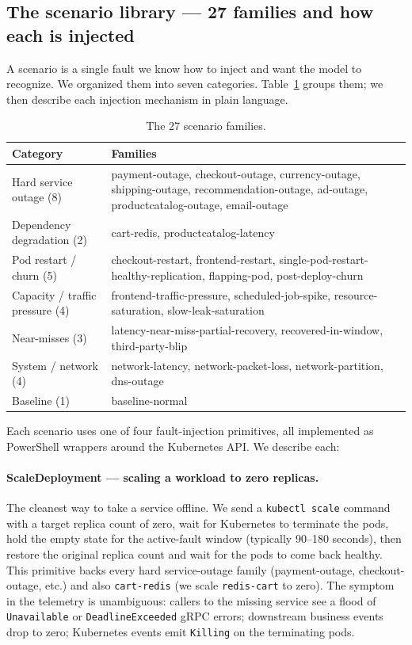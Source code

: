 \subsection{The scenario library --- 27 families and how each is injected}

A scenario is a single fault we know how to inject and want the model to recognize. We organized them into seven categories. Table~\ref{tab:scenarios} groups them; we then describe each injection mechanism in plain language.

\begin{table}[h]
\centering
\caption{The 27 scenario families.}
\label{tab:scenarios}
\small
\begin{tabularx}{\linewidth}{l X}
\toprule
Category & Families \\
\midrule
Hard service outage (8) & payment-outage, checkout-outage, currency-outage, shipping-outage, recommendation-outage, ad-outage, productcatalog-outage, email-outage \\
Dependency degradation (2) & cart-redis, productcatalog-latency \\
Pod restart / churn (5) & checkout-restart, frontend-restart, single-pod-restart-healthy-replication, flapping-pod, post-deploy-churn \\
Capacity / traffic pressure (4) & frontend-traffic-pressure, scheduled-job-spike, resource-saturation, slow-leak-saturation \\
Near-misses (3) & latency-near-miss-partial-recovery, recovered-in-window, third-party-blip \\
System / network (4) & network-latency, network-packet-loss, network-partition, dns-outage \\
Baseline (1) & baseline-normal \\
\bottomrule
\end{tabularx}
\end{table}

Each scenario uses one of four fault-injection primitives, all implemented as PowerShell wrappers around the Kubernetes API. We describe each:

\paragraph{ScaleDeployment --- scaling a workload to zero replicas.} The cleanest way to take a service offline. We send a \texttt{kubectl scale} command with a target replica count of zero, wait for Kubernetes to terminate the pods, hold the empty state for the active-fault window (typically 90--180 seconds), then restore the original replica count and wait for the pods to come back healthy. This primitive backs every hard service-outage family (payment-outage, checkout-outage, etc.) and also \texttt{cart-redis} (we scale \texttt{redis-cart} to zero). The symptom in the telemetry is unambiguous: callers to the missing service see a flood of \texttt{Unavailable} or \texttt{DeadlineExceeded} gRPC errors; downstream business events drop to zero; Kubernetes events emit \texttt{Killing} on the terminating pods.

